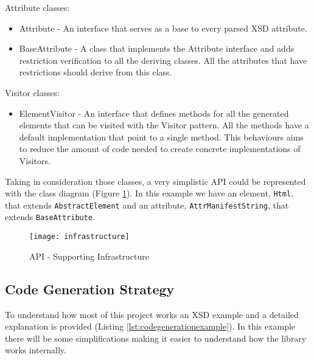 Attribute classes:

\begin{itemize}  
	\item Attribute - An interface that serves as a base to every parsed \ac{XSD} attribute.
	\item BaseAttribute - A class that implements the Attribute interface and adds restriction verification to all the deriving classes. All the attributes that have restrictions should derive from this class.
\end{itemize}

Visitor classes:

\begin{itemize}
	\item ElementVisitor - An interface that defines methods for all the generated elements that can be visited with the Visitor pattern. All the methods have a default implementation that point to a single method. This behaviours aims to reduce the amount of code needed to create concrete implementations of  Visitors.
\end{itemize}

\noindent
Taking in consideration those classes, a very simplistic \ac{API} could be represented with the class diagram (Figure \ref{img:infrastructure}). In this example we have an element, \texttt{Html}, that extends \texttt{AbstractElement} and an attribute, \texttt{AttrManifestString}, that extends \texttt{BaseAttribute}. 


\begin{figure}[h]
	\centering
	\texttt{[image: infrastructure]}
	\caption{API - Supporting Infrastructure}
	\label{img:infrastructure}
\end{figure}

\subsection{Code Generation Strategy}
\label{sec:codegenerationstrategy}

\noindent
To understand how most of this project works an \ac{XSD} example and a detailed explanation is provided (Listing \ref{lst:codegenerationexample}). In this example there will be some simplifications making it easier to understand how the library works internally.

\bigskip


